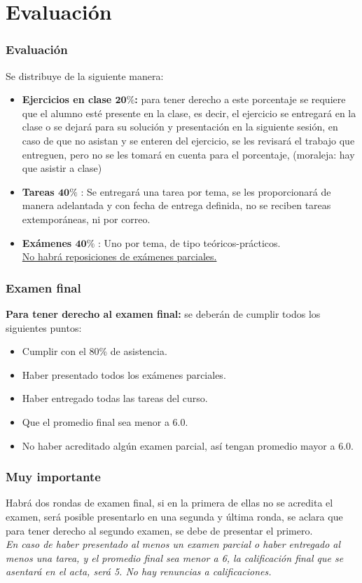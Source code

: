 \documentclass[12pt]{beamer}
\begin{document}
\section{Evaluación}
\begin{frame}
\frametitle{Evaluación}
Se distribuye de la siguiente manera:
\begin{itemize}
\item \textbf{Ejercicios en clase $\mathbf{20\%}$:} para tener derecho a este porcentaje se requiere que el alumno esté presente en la clase, es decir, el ejercicio se entregará en la clase o se dejará para su solución y presentación en la siguiente sesión, en caso de que no asistan y se enteren del ejercicio, se les revisará el trabajo que entreguen, pero no se les tomará en cuenta para el porcentaje, (moraleja: hay que asistir a clase) 
\end{itemize}
\end{frame}
\begin{frame}
\begin{itemize}
\item \textbf{Tareas $\mathbf{40\%}$} : Se entregará una tarea por tema, se les proporcionará de manera adelantada y con fecha de entrega definida, no se reciben tareas extemporáneas, ni por correo.
\item \textbf{Exámenes $\mathbf{40\%}$} : Uno por tema, de tipo teóricos-prácticos. 
\\
\bigskip
\underline{No habrá reposiciones de exámenes parciales.}
\end{itemize}
\end{frame}
\begin{frame}
\frametitle{Examen final}
\textbf{Para tener derecho al examen final:} se deberán de cumplir todos los siguientes puntos:
\begin{itemize}
\item Cumplir con el 80\% de asistencia.
\item Haber presentado todos los exámenes parciales.
\item Haber entregado todas las tareas del curso.
\item Que el promedio final sea menor a $6.0$.
\item No haber acreditado algún examen parcial, así tengan promedio mayor a $6.0$.
\end{itemize}
\end{frame}
\begin{frame}
\frametitle{Muy importante}
Habrá dos rondas de examen final, si en la primera de ellas no se acredita el examen, será posible presentarlo en una segunda y última ronda, se aclara que para tener derecho al segundo examen, se debe de presentar el primero.
\\
\bigskip
\emph{En caso de haber presentado al menos un examen parcial o haber entregado al menos una tarea, y el promedio final sea menor a 6, la calificación final que se asentará en el acta, será 5. No hay renuncias a calificaciones.}
\end{frame}
\end{document}
